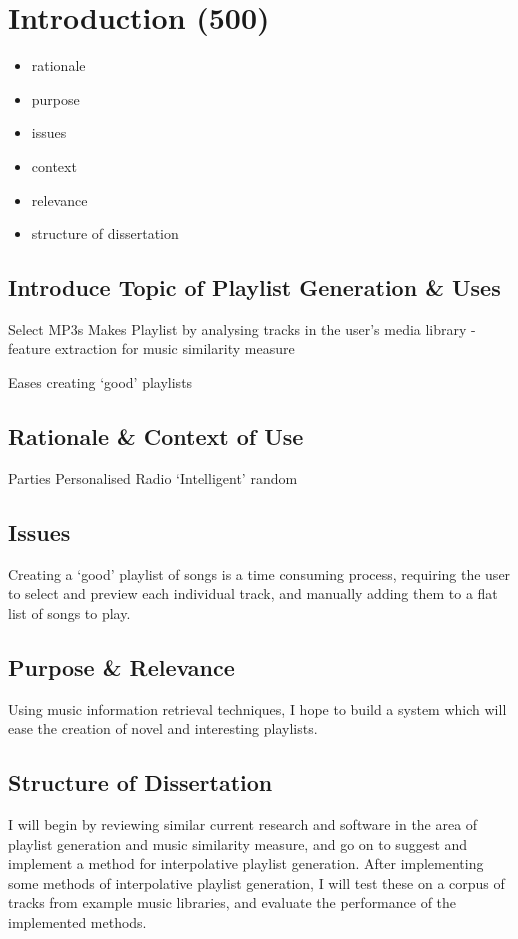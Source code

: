 \chapter{Introduction (500)}
\begin{itemize}
	\item rationale
	\item purpose
	\item issues
	\item context
	\item relevance
	\item structure of dissertation
\end{itemize}
\section{Introduce Topic of Playlist Generation \& Uses}
Select MP3s
Makes Playlist by analysing tracks in the user's media library
	- feature extraction for music similarity measure

Eases creating `good' playlists

\section{Rationale \& Context of Use}
Parties
Personalised Radio
`Intelligent' random
\section{Issues}
Creating a `good' playlist of songs is a time consuming process, requiring the user to select and preview each individual track, and manually adding them to a flat list of songs to play.
\section{Purpose \& Relevance}
Using music information retrieval techniques, I hope to build a system which will ease the creation of novel and interesting playlists.
\section{Structure of Dissertation}
I will begin by reviewing similar current research and software in the area of playlist generation and music similarity measure, and go on to suggest and implement a method for interpolative playlist generation. After implementing some methods of interpolative playlist generation, I will test these on a corpus of tracks from example music libraries, and evaluate the performance of the implemented methods.
